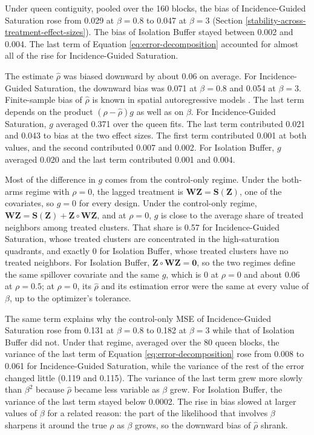 \documentclass[11pt]{article}
\begin{document}
Under queen contiguity, pooled over the 160 blocks, the bias of
Incidence-Guided Saturation rose from 0.029 at \(\beta=0.8\) to 0.047
at \(\beta=3\) (Section \ref{stability-across-treatment-effect-sizes}).
The bias of Isolation Buffer stayed between 0.002 and 0.004. The last
term of Equation \ref{eq:error-decomposition} accounted for almost all
of the rise for Incidence-Guided Saturation.

The estimate \(\hat\rho\) was biased downward by about 0.06 on average.
For Incidence-Guided Saturation, the downward bias was 0.071 at
\(\beta=0.8\) and 0.054 at \(\beta=3\). Finite-sample bias of
\(\hat\rho\) is known in spatial autoregressive models
\citep{bao_finite-sample_2013}. The last term depends on the product
\((\rho-\hat\rho)g\) as well as on \(\beta\). For Incidence-Guided
Saturation, \(g\) averaged 0.371 over the queen fits. The last term
contributed 0.021 and 0.043 to bias at the two effect sizes. The first
term contributed 0.001 at both values, and the second contributed
0.007 and 0.002. For Isolation Buffer, \(g\) averaged 0.020 and the
last term contributed 0.001 and 0.004.

Most of the difference in
\(g\) comes from the control-only regime. Under the both-arms regime
with \(\rho = 0\), the lagged treatment is \(\mathbf{W}\mathbf{Z} = \mathbf{S}(\mathbf{Z})\), one of
the covariates, so \(g = 0\) for every design. Under the control-only
regime, \(\mathbf{W}\mathbf{Z} = \mathbf{S}(\mathbf{Z}) + \mathbf{Z} \circ \mathbf{W}\mathbf{Z}\), and at \(\rho = 0\), \(g\) is
close to the average share of treated neighbors among treated clusters.
That share is 0.57 for Incidence-Guided Saturation, whose
treated clusters are concentrated in the high-saturation quadrants, and
exactly 0 for Isolation Buffer, whose treated clusters have no treated
neighbors. For Isolation Buffer, \(\mathbf{Z} \circ \mathbf{W}\mathbf{Z} = \mathbf{0}\), so the two regimes
define the same spillover covariate and the same \(g\), which is 0 at
\(\rho = 0\) and about 0.06 at \(\rho = 0.5\); at \(\rho = 0\), its
\(\hat\rho\) and its estimation error were the same at every value of
\(\beta\), up to the optimizer's tolerance.

The same term explains why the control-only MSE of Incidence-Guided
Saturation rose from 0.131 at \(\beta = 0.8\) to 0.182 at
\(\beta = 3\) while that of Isolation Buffer did not. Under that regime,
averaged over the 80 queen blocks, the variance of the last term of
Equation \ref{eq:error-decomposition} rose from 0.008 to 0.061 for
Incidence-Guided Saturation, while the variance of the rest of
the error changed little (0.119 and 0.115). The variance of the last
term grew more slowly than \(\beta^2\) because \(\hat\rho\) became less
variable as \(\beta\) grew. For Isolation Buffer, the variance of the
last term stayed below 0.0002. The rise in bias slowed at larger values
of \(\beta\) for a related reason: the part of the likelihood that
involves \(\beta\) sharpens it around the true \(\rho\) as \(\beta\)
grows, so the downward bias of \(\hat\rho\) shrank.
\end{document}
